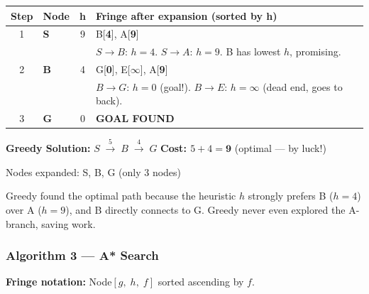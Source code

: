 \documentclass[12pt, a4paper]{article}
\newenvironment{answerbox}{\begin{mdframed}[style=answerframe]}{\end{mdframed}}
\newcommand{\goal}{\textcolor{green!55!black}{\textbf{GOAL FOUND}}}
\begin{document}
\vspace{0.4em}
\begin{center}
\renewcommand{\arraystretch}{1.25}
\small
\begin{tabular}{c|l|c|p{8.5cm}}
\toprule
\textbf{Step} & \textbf{Node} & \textbf{h} &
\textbf{Fringe after expansion (sorted by h)} \\
\midrule
1 & \textbf{S} & 9
  & B[\textbf{4}],\; A[\textbf{9}] \\
  & & & \footnotesize $S{\to}B$: $h{=}4$. $S{\to}A$: $h{=}9$. B has lowest $h$, promising. \\
\midrule
2 & \textbf{B} & 4
  & G[\textbf{0}],\; E[\textbf{$\infty$}],\; A[\textbf{9}] \\
  & & & \footnotesize $B{\to}G$: $h{=}0$ (goal!). $B{\to}E$: $h{=}\infty$ (dead end, goes to back). \\
\midrule
3 & \textbf{G} & 0
  & \goal \\
\bottomrule
\end{tabular}
\end{center}

\begin{answerbox}
\textbf{Greedy Solution:} $S \;\xrightarrow{5}\; B \;\xrightarrow{4}\; G$
\hfill \textbf{Cost: $5+4 = \mathbf{9}$} (optimal — by luck!)

Nodes expanded: S, B, G \quad(only 3 nodes)

Greedy found the optimal path because the heuristic $h$ strongly prefers B ($h{=}4$) over A ($h{=}9$), and B directly connects to G. Greedy never even explored the A-branch, saving work.
\end{answerbox}

\vspace{1em}

\subsubsection*{Algorithm 3 — A* Search}

\textbf{Fringe notation:} Node$[g,\; h,\; f]$ sorted ascending by $f$.
\end{document}
